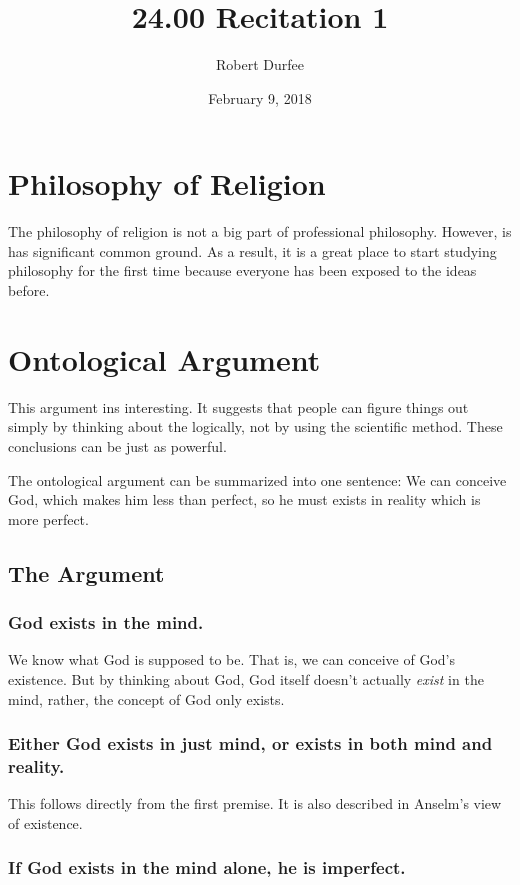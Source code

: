 \documentclass{article}
\title{ 24.00 Recitation 1 }
\author{ Robert Durfee }
\date{ February 9, 2018 }
\begin{document}
\maketitle

\section{ Philosophy of Religion }

The philosophy of religion is not a big part of professional philosophy.
However, is has significant common ground. As a result, it is a great place to
start studying philosophy for the first time because everyone has been exposed
to the ideas before.

\section{Ontological Argument}

This argument ins interesting. It suggests that people can figure things out
simply by thinking about the logically, not by using the scientific method.
These conclusions can be just as powerful.

The ontological argument can be summarized into one sentence: We can conceive
God, which makes him less than perfect, so he must exists in reality which is
more perfect.

\subsection{The Argument}

\subsubsection*{God exists in the mind.}

We know what God is supposed to be. That is, we can conceive of God's existence.
But by thinking about God, God itself doesn't actually \textit{exist} in the
mind, rather, the concept of God only exists.

\subsubsection*{Either God exists in just mind, or exists in both mind and
reality.}

This follows directly from the first premise. It is also described in Anselm's
view of existence.

\subsubsection*{If God exists in the mind alone, he is imperfect.}
\end{document}
